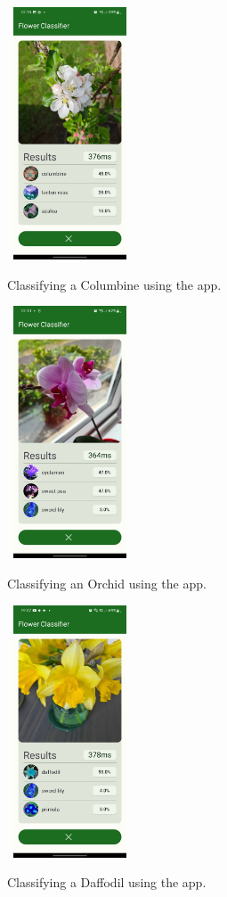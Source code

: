 \documentclass[12pt,a4paper]{report}
\begin{document}
\begin{figure}[h]\
    \includegraphics[width=0.3\textwidth]{columbine.jpg}
    \caption{Classifying a Columbine using the app.}
    \label{fig:columbine}
\end{figure}


\begin{figure}[h]\
    \includegraphics[width=0.3\textwidth]{cyclamen.jpg}
    \caption{Classifying an Orchid using the app.}
    \label{fig:cyclamen}
\end{figure}

\begin{figure}[h]\
    \includegraphics[width=0.3\textwidth]{daffodil.jpg}
    \caption{Classifying a Daffodil using the app.}
    \label{fig:daffodil}
\end{figure}
\end{document}
